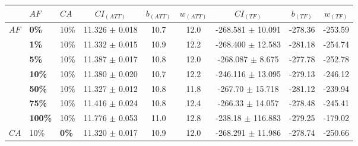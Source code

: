 \begin{sidewaystable}
    \begin{tabular}{|l|l|l||c|c|c|c|c|c|}
    \hline
    ~ & $AF$ & $CA$ & $CI_{(ATT)}$ & $b_{(ATT)}$ & $w_{(ATT)}$ & $CI_{(TF)}$ & $b_{(TF)}$ & $w_{(TF)}$ \\
    \hline
    $AF$ & \textbf{0\%} & 10\% & 11.326 $\pm$ 0.018 & 10.7 & 12.0 & -268.581 $\pm$ 10.091 & -278.36 & -253.59   \\
    ~ & \textbf{1\%} & 10\% & 11.332 $\pm$ 0.015 & 10.9 & 12.2 &  -268.400 $\pm$ 12.583  & -281.18 & -254.74   \\
    ~ & \textbf{5\%} & 10\% & 11.387 $\pm$ 0.017 & 10.8 & 12.0 &  -268.087 $\pm$ 8.675 & -277.78 & -252.78  \\ 
    ~ & \textbf{10\%} & 10\% & 11.380 $\pm$ 0.020 & 10.7 & 12.2 &   -246.116 $\pm$ 13.095  & -279.13 & -246.12  \\ 
    ~ & \textbf{50\%} & 10\% & 11.327 $\pm$ 0.012 & 10.8 & 11.8 & -267.70 $\pm$ 15.718 & -281.12& -239.94  \\ 
    ~ & \textbf{75\%} & 10\% & 11.416 $\pm$ 0.024 & 10.8 & 12.4 & -266.33 $\pm$ 14.057 & -278.48 & -245.41 \\ 
    ~ & \textbf{100\%} & 10\% & 11.776 $\pm$ 0.053 & 11.0 & 12.8 & -238.18 $\pm$ 116.883 & -279.25 & -179.02\\ 
    \hline
    $CA$ & 10\% &\textbf{0\%} & 11.320 $\pm$ 0.017 & 10.9 & 12.0 &  -268.291 $\pm$ 11.986 & -278.74 & -250.66 \\


\end{tabular}
\end{sidewaystable}
